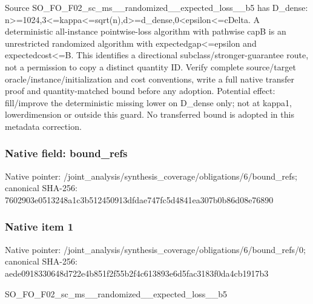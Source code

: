 \documentclass[10pt,a4paper]{article}
\begin{document}
\begingroup\raggedright\sloppy Source SO\_\allowbreak{}FO\_\allowbreak{}F02\_\allowbreak{}sc\_\allowbreak{}ms\_\allowbreak{}\_\allowbreak{}randomized\_\allowbreak{}\_\allowbreak{}expected\_\allowbreak{}loss\_\allowbreak{}\_\allowbreak{}b5 has D\_\allowbreak{}dense:\allowbreak{} n>=\allowbreak{}1024,\allowbreak{}3<=\allowbreak{}kappa<=\allowbreak{}sqrt(n),\allowbreak{}d>=\allowbreak{}d\_\allowbreak{}dense,\allowbreak{}0<epsilon<=\allowbreak{}cDelta. A deterministic all-instance pointwise-loss algorithm with pathwise capB is an unrestricted randomized algorithm with expectedgap<=\allowbreak{}epsilon and expectedcost<=\allowbreak{}B. This identifies a directional subclass/\allowbreak{}stronger-guarantee route,\allowbreak{} not a permission to copy a distinct quantity ID. Verify complete source/\allowbreak{}target oracle/\allowbreak{}instance/\allowbreak{}initialization and cost conventions,\allowbreak{} write a full native transfer proof and quantity-matched bound before any adoption. Potential effect:\allowbreak{} fill/\allowbreak{}improve the deterministic missing lower on D\_\allowbreak{}dense only;\allowbreak{} not at kappa1,\allowbreak{} lowerdimension or outside this guard. No transferred bound is adopted in this metadata correction.\par\endgroup

\subsubsection{Native field: bound\_\allowbreak{}refs}
Native pointer: /joint\_\allowbreak{}analysis/synthesis\_\allowbreak{}coverage/obligations/6/bound\_\allowbreak{}refs; canonical SHA-256: 7602903e0513248a1c3b512450913dfdae747fc5d4841ea307b0b86d08e76890

\subsubsection{Native item 1}
Native pointer: /joint\_\allowbreak{}analysis/synthesis\_\allowbreak{}coverage/obligations/6/bound\_\allowbreak{}refs/0; canonical SHA-256: aede0918330648d722e4b851f2f55b2f4c613893e6d5fac3183f0da4cb1917b3

\begingroup\raggedright\sloppy SO\_\allowbreak{}FO\_\allowbreak{}F02\_\allowbreak{}sc\_\allowbreak{}ms\_\allowbreak{}\_\allowbreak{}randomized\_\allowbreak{}\_\allowbreak{}expected\_\allowbreak{}loss\_\allowbreak{}\_\allowbreak{}b5\par\endgroup
\end{document}
